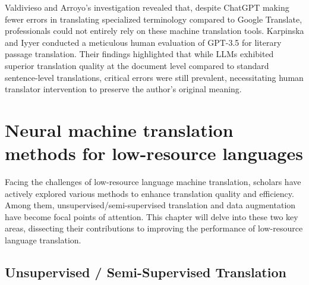\documentclass[acmsmall]{acmart}
\begin{document}
Valdivieso and Arroyo's investigation \cite{sanz2023google} revealed that, despite ChatGPT making fewer errors in translating specialized terminology compared to Google Translate, professionals could not entirely rely on these machine translation tools. Karpinska and Iyyer \cite{Marzena} conducted a meticulous human evaluation of GPT-3.5 for literary passage translation. Their findings highlighted that while LLMs exhibited superior translation quality at the document level compared to standard sentence-level translations, critical errors were still prevalent, necessitating human translator intervention to preserve the author's original meaning.
\color{black}




\section{Neural machine translation methods for low-resource languages}

\label{sec4}
Facing the challenges of low-resource language machine translation, scholars have actively explored various methods to enhance translation quality and efficiency. Among them, unsupervised/semi-supervised translation and data augmentation have become focal points of attention. This chapter will delve into these two key areas, dissecting their contributions to improving the performance of low-resource language translation.



\subsection{Unsupervised / Semi-Supervised Translation}
\end{document}
